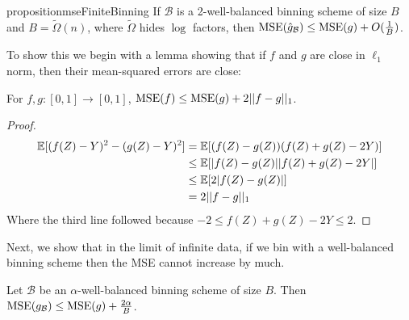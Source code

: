 \begin{restatable}{proposition}{mseFiniteBinning}
\label{prop:mse-finite-binning}
If $\mathcal{B}$ is a 2-well-balanced binning scheme of size $B$ and $B = \widetilde{\Omega}(n)$, where $\widetilde{\Omega}$ hides $\log$ factors, then $\textup{MSE}(\hat{g}_{\mathcal{B}}) \leq \textup{MSE}(g) + O(\frac{1}{B})$.
\end{restatable}

To show this we begin with a lemma showing that if $f$ and $g$ are close in $\ell_1$ norm, then their mean-squared errors are close:

\begin{lemma}
\label{lem:mse-l1}
For $f, g : [0, 1] \to [0, 1]$, $\textup{MSE}(f) \leq \textup{MSE}(g) + 2||f - g||_1$.
\end{lemma}

\begin{proof}
\begin{align*}
\mathbb{E}[(f(Z) - Y)^2 - (g(Z) - Y)^2] &= \mathbb{E}[(f(Z) - g(Z))(f(Z) + g(Z) - 2Y)] \\
&\leq \mathbb{E}[|f(Z) - g(Z)||f(Z) + g(Z) - 2Y|] \\
&\leq \mathbb{E}[2|f(Z) - g(Z)|] \\
& =2||f-g||_1
\end{align*}
Where the third line followed because $-2 \leq f(Z) + g(Z) - 2Y \leq 2$.
\end{proof}

Next, we show that in the limit of infinite data, if we bin with a well-balanced binning scheme then the MSE cannot increase by much.

\begin{lemma}
\label{thm:bin-sharpness}
Let $\mathcal{B}$ be an $\alpha$-well-balanced binning scheme of size $B$. Then $\textup{MSE}(g_{\mathcal{B}}) \leq \textup{MSE}(g) + \frac{2\alpha}{B}$.
\end{lemma}


